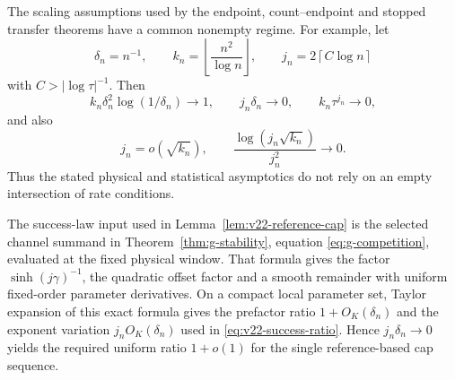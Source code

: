\begin{remark}
\label{rem:v23-compatible-rates}
The scaling assumptions used by the endpoint, count--endpoint and stopped
transfer theorems have a common nonempty regime.  For example, let
\[
 \delta_n=n^{-1},\qquad
 k_n=\left\lfloor\frac{n^2}{\log n}\right\rfloor,
 \qquad
 j_n=2\left\lceil C\log n\right\rceil
\]
with \(C>|\log\tau|^{-1}\).  Then
\[
 k_n\delta_n^2\log(1/\delta_n)\to1,\qquad
 j_n\delta_n\to0,\qquad
 k_n\tau^{j_n}\to0,
\]
and also
\[
 j_n=o(\sqrt{k_n}),
 \qquad
 \frac{\log(j_n\sqrt{k_n})}{j_n^2}\to0.
\]
Thus the stated physical and statistical asymptotics do not rely on an empty
intersection of rate conditions.
\end{remark}

\begin{remark}
\label{rem:v23-cap-source}
The success-law input used in Lemma~\ref{lem:v22-reference-cap} is the selected
channel summand in Theorem~\ref{thm:g-stability}, equation
\eqref{eq:g-competition}, evaluated at the fixed physical window.  That
formula gives the factor \(\sinh(j\gamma)^{-1}\), the quadratic offset factor
and a smooth remainder with uniform fixed-order parameter derivatives.  On a
compact local parameter set, Taylor expansion of this exact formula gives the
prefactor ratio \(1+O_K(\delta_n)\) and the exponent variation
\(j_nO_K(\delta_n)\) used in
\eqref{eq:v22-success-ratio}.  Hence \(j_n\delta_n\to0\) yields the required
uniform ratio \(1+o(1)\) for the single reference-based cap sequence.
\end{remark}
